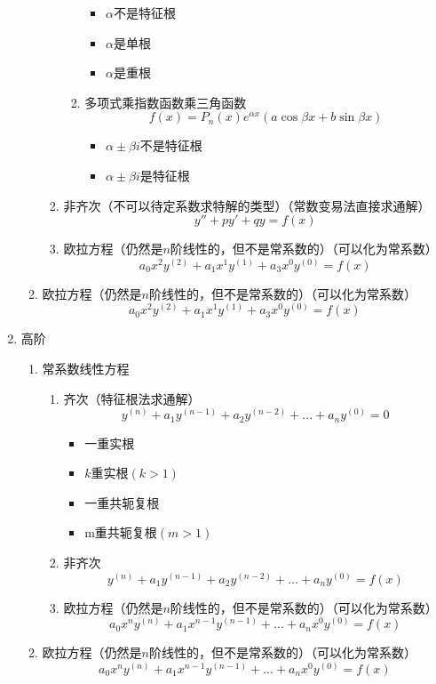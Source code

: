 \documentclass[UTF8]{ctexart}
\begin{document}
\begin{enumerate}
\begin{enumerate}
\begin{enumerate}
\begin{enumerate}
                \begin{itemize}
                    \item \(\alpha\)不是特征根
                    \item \(\alpha\)是单根
                    \item \(\alpha\)是重根
                \end{itemize}
                \item 多项式乘指数函数乘三角函数\[f(x)=P_n(x)e^{\alpha x}(a\cos \beta x +b\sin \beta x)\]
                \begin{itemize}
                    \item \(\alpha \pm \beta i\)不是特征根
                    \item \(\alpha \pm \beta i\)是特征根
                \end{itemize}

            \end{enumerate}
            \item 非齐次（不可以待定系数求特解的类型）（常数变易法直接求通解）\[y''+py'+qy=f(x)\]
            \item 欧拉方程（仍然是$n$阶线性的，但不是常系数的）（可以化为常系数）\[a_0x^2y^{(2)}+a_1x^1y^{(1)}+a_3x^0y^{(0)}=f(x)\]
        \end{enumerate}
        \item 欧拉方程（仍然是$n$阶线性的，但不是常系数的）（可以化为常系数）\[a_0x^2y^{(2)}+a_1x^1y^{(1)}+a_3x^0y^{(0)}=f(x)\]
    
    \end{enumerate}
    \item 高阶
    \begin{enumerate}
        \item 常系数线性方程
        \begin{enumerate}
            \item 齐次（特征根法求通解）\[y^{(n)}+a_1y^{(n-1)}+a_2y^{(n-2)}+...+a_ny^{(0)}=0\]
            \begin{itemize}
                \item 一重实根
                \item $k$重实根$(k>1)$
                \item 一重共轭复根
                \item m重共轭复根$(m>1)$
            \end{itemize}
            \item 非齐次\[y^{(n)}+a_1y^{(n-1)}+a_2y^{(n-2)}+...+a_ny^{(0)}=f(x)\]
            \item 欧拉方程（仍然是$n$阶线性的，但不是常系数的）（可以化为常系数）\[a_0x^ny^{(n)}+a_1x^{n-1}y^{(n-1)}+...+a_nx^0y^{(0)}=f(x)\]
        \end{enumerate}
        \item 欧拉方程（仍然是$n$阶线性的，但不是常系数的）（可以化为常系数）\[a_0x^ny^{(n)}+a_1x^{n-1}y^{(n-1)}+...+a_nx^0y^{(0)}=f(x)\]
        \end{enumerate}
    \end{enumerate}
\end{document}
